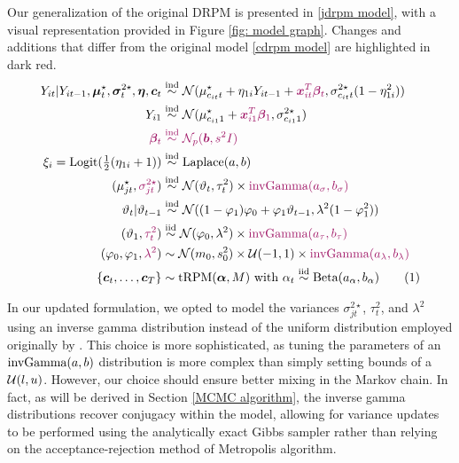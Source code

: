 \documentclass[12pt,	%
	a4paper,		%
	twoside,		%
	openright,		%
	titlepage,%
	]{book}
\newcommand\numberthis{\addtocounter{equation}{1}\tag{\theequation}}
\theoremstyle{definition}
\let\cite\citep
\begin{document}
Our generalization of the original DRPM is presented in \eqref{jdrpm model}, with a visual representation provided in Figure \ref{fig: model graph}. Changes and additions that differ from the original model \eqref{cdrpm model} are highlighted in dark red. 
\begin{align*}
Y_{it}|Y_{it-1},\vec{\mu}^{\star}_t,\vec{\sigma}^{2\star}_t, \vec{\eta},\vec{c}_t &\simind \mathcal{N}(\mu_{c_{it}t}^\star+\eta_{1i}Y_{it-1} + \alert{\vec{x}_{it}^T\vec{\beta}_t},\sigma^{2\star}_{c_{it}t}(1-\eta_{1i}^2)) \\
Y_{i1} &\simind \mathcal{N}(\mu^\star_{c_{i1}1}+ \alert{\vec{x}_{i1}^T\vec{\beta}_1},\sigma^{2\star}_{c_{i1}1})\\
%
\alert{\vec{\beta}_t} &\; \alert{\simind} \; \alert{\N_p(\vec{b},s^2 I)}\\
\xi_i = \text{Logit$(\tfrac{1}{2}(\eta_{1i}+1)$}) &\simind \text{Laplace$(a,b)$}\\
%
( \mu_{jt}^\star, \alert{\sigma_{jt}^{2\star}}) &\simind \N(\theta_t,\tau_t^2) \times \alert{\invgamma(a_\sigma,b_\sigma)}\\
%
\theta_t | \theta_{t-1} &\simind \N((1-\phi_1)\phi_0 + \phi_1\theta_{t-1},\lambda^2(1-\phi_1^2))\\
%
(\theta_1,\alert{\tau_t^2}) &\simiid \N(\phi_0,\lambda^2) \times  \alert{\invgamma (a_\tau,b_\tau)}\\
%
(\phi_0,\phi_1,\alert{\lambda^2}) &\sim \N(m_0,s_0^2) \times \U(-1,1) \times \alert{\invgamma (a_\lambda,b_\lambda)}\\
%
\{\vec{c}_t, \ldots, \vec{c}_T\} &\sim \text{tRPM}(\vec{\alpha}, M) \text{ with } \alpha_t \simiid \text{Beta}(a_\alpha, b_\alpha)
 \numberthis \label{jdrpm model}
\end{align*}


In our updated formulation, we opted to model the variances $\sigma^{2\star}_{jt}$, $\tau^2_t$, and $\lambda^2$ using an inverse gamma distribution instead of the uniform distribution employed originally by \cite{1-drpm}. This choice is more sophisticated, as tuning the parameters of an $\text{invGamma}(a,b)$ distribution is more complex than simply setting bounds of a $\mathcal{U}(l,u)$. However, our choice should ensure better mixing in the Markov chain. In fact, as will be derived in Section \ref{MCMC algorithm}, the inverse gamma distributions recover conjugacy within the model, allowing for variance updates to be performed using the analytically exact Gibbs sampler rather than relying on the acceptance-rejection method of Metropolis algorithm. 
\end{document}
